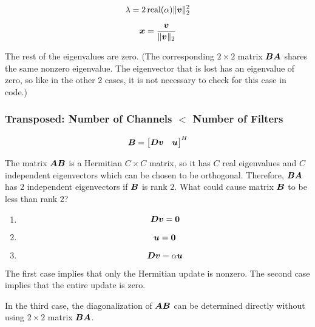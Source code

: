 \documentclass{article}
\begin{document}
\begin{equation}
\lambda = 2\operatorname{real}(\alpha) \|\bm{v}\|_2^2
\end{equation}

\begin{equation}
\bm{x} = \frac{\bm{v}}{\|\bm{v}\|_2}
\end{equation}

The rest of the eigenvalues are zero.  (The corresponding $2 \times 2$ matrix $\bm{B}\bm{A}$ shares the same nonzero eigenvalue. The eigenvector that is lost has an eigenvalue of zero, so like in the other $2$ cases, it is not necessary to check for this case in code.)


\subsubsection{Transposed: Number of Channels $<$ Number of Filters}



\begin{equation}
\bm{B} = \begin{bmatrix} \bm{D}\bm{v} & \bm{u}\end{bmatrix}^H
\end{equation}


The matrix $\bm{A}\bm{B}$ is a Hermitian $C \times C$ matrix, so it has $C$ real eigenvalues and $C$ independent eigenvectors which can be chosen to be orthogonal. Therefore, $\bm{B}\bm{A}$ has $2$ independent eigenvectors if $\bm{B}$ is rank $2$.  What could cause matrix $\bm{B}$ to be less than rank $2$?

\begin{enumerate}
\item
\begin{equation}
\bm{D}\bm{v} = \bm{0}
\end{equation}
\item

\begin{equation}
\bm{u} = \bm{0}
\end{equation}
\item
\begin{equation}
\bm{D}\bm{v} = \alpha \bm{u}
\end{equation}
\end{enumerate}

The first case implies that only the Hermitian update is nonzero.  The second case implies that the entire update is zero.

In the third case, the diagonalization of $\bm{A}\bm{B}$ can be determined directly without using $2 \times 2$ matrix $\bm{B}\bm{A}$.
\end{document}
